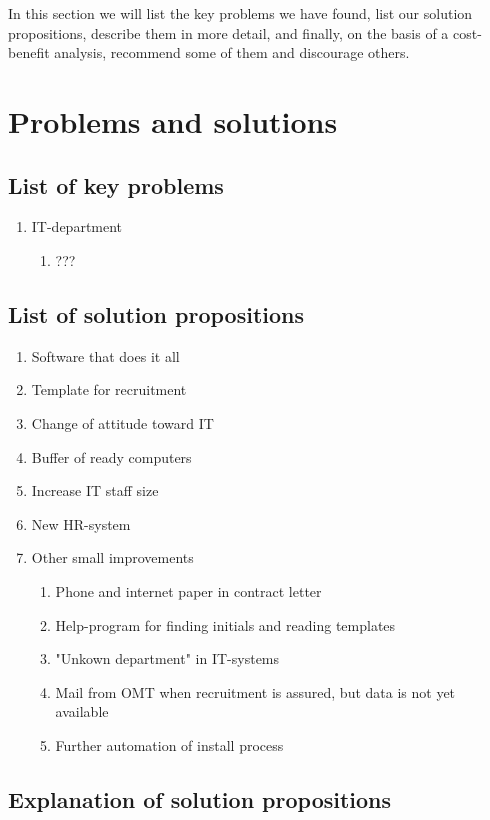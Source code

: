 In this section we will list the key problems we have found, list our solution propositions, describe them in more detail, and finally, on the basis of a cost-benefit analysis, recommend some of them and discourage others.

\section{Problems and solutions}
\subsection{List of key problems}
\begin{enumerate}
\item IT-department
	\begin{enumerate}
	\item ???
	\end{enumerate}
\end{enumerate}

\subsection{List of solution propositions}
\begin{enumerate}
\item Software that does it all
\item Template for recruitment
\item Change of attitude toward IT
\item Buffer of ready computers
\item Increase IT staff size
\item New HR-system
\item Other small improvements
	\begin{enumerate}
	\item Phone and internet paper in contract letter
	\item Help-program for finding initials and reading templates
	\item "Unkown department" in IT-systems
	\item Mail from OMT when recruitment is assured, but data is not yet available
	\item Further automation of install process
	\end{enumerate}
\end{enumerate}

\subsection{Explanation of solution propositions}
